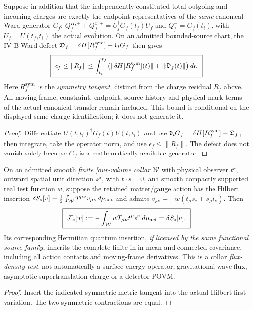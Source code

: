 \documentclass[12pt,a4paper]{article}
\begin{document}
\begin{corollary}
\label{p4b:cor:v254-ward-operator-residual}
Suppose in addition that the independently constituted total
outgoing and incoming charges are exactly the endpoint representatives
of the \emph{same} canonical Ward generator $G_f$:
$Q^{H,+}_f+Q^{S,+}_f=U_f^\dagger G_f(t_f)U_f$ and
$Q^-_f=G_f(t_i)$, with $U_f=U(t_f,t_i)$ the actual evolution.
On an admitted bounded-source chart, the IV-B Ward defect
$\mathfrak D_f=\delta H[R_f^{\rm sym}]-\mathfrak d_tG_f$
then gives
\[
\boxed{\ \epsilon_f\le\|R_f\|
\le \int_{t_i}^{t_f}
\bigl(\|\delta H[R_f^{\rm sym}](t)\|+\|\mathfrak D_f(t)\|\bigr)\,dt.\ }
\]
Here $R_f^{\rm sym}$ is the \emph{symmetry tangent}, distinct from the
charge residual $R_f$ above. All moving-frame, constraint, endpoint,
source-history and physical-mark terms of the actual canonical transfer
remain included. This bound is conditional on the displayed
same-charge identification; it does not generate it.
\end{corollary}
\begin{proof}
Differentiate $U(t,t_i)^\dagger G_f(t)U(t,t_i)$ and use
$\mathfrak d_tG_f=\delta H[R_f^{\rm sym}]-\mathfrak D_f$;
then integrate, take the operator norm, and use
$\epsilon_f\le\|R_f\|$. The defect does not vanish solely because
$G_f$ is a mathematically available generator.
\end{proof}

\begin{proposition}
\label{p4b:prop:v254-same-action-angular-flux}
On an admitted smooth \emph{finite four-volume collar} $\mathcal W$
with physical observer $t^\mu$, outward spatial unit direction
$s^\mu$, with $t\cdot s=0$, and smooth compactly supported real test function $w$, suppose the retained
matter/gauge action has the Hilbert insertion
$\delta S_s[v]=\tfrac12\int_{\mathcal W}T^{\mu\nu}v_{\mu\nu}\,d\mu_{\rm act}$
and admits $v_{\mu\nu}=-w(t_\mu s_\nu+s_\mu t_\nu)$.
Then
\[
\boxed{\ \mathcal F_s[w]:=-\int_{\mathcal W}
 w T_{\mu\nu}t^\mu s^\nu\,d\mu_{\rm act}
 =\delta S_s[v].\ }
\]
Its corresponding Hermitian quantum insertion, \emph{if licensed by the
same functional source family}, inherits the complete finite in-in
mean and connected covariance, including all action contacts and
moving-frame derivatives. This is a collar \emph{flux-density test},
not automatically a surface-energy operator, gravitational-wave flux,
asymptotic supertranslation charge or a detector POVM.
\end{proposition}
\begin{proof}
Insert the indicated symmetric metric tangent into the actual
Hilbert first variation. The two symmetric contractions are equal.
\end{proof}
\end{document}
